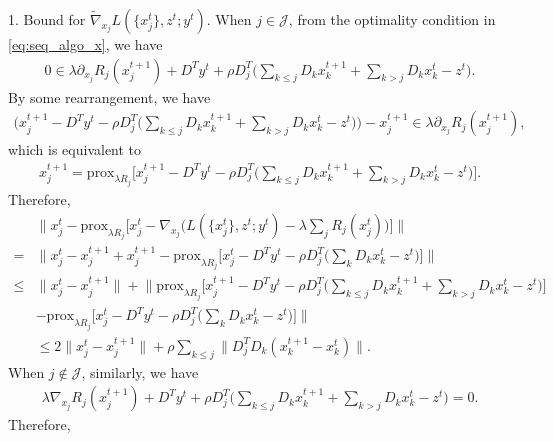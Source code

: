 1. Bound for $\tilde{\nabla}_{x_j} L(\{x^t_j\}, z^t; y^t)$. When $j\in\mathcal{J}$, from the optimality condition in \eqref{eq:seq_algo_x}, we have 
\begin{align}
    0 \in \lambda\partial_{x_j}R_j(x_j^{t+1}) + D^Ty^t + \rho D_j^T\big(\sum_{k\le j} D_kx_k^{t+1} + \sum_{k>j} D_kx_k^{t} - z^{t}\big).\nonumber
\end{align}
By some rearrangement, we have
\begin{align}
    \big(x_j^{t+1} - D^Ty^t - \rho D_j^T\big(\sum_{k\le j} D_kx_k^{t+1} + \sum_{k>j} D_kx_k^{t} - z^{t}\big)\big) - x_j^{t+1} \in \lambda\partial_{x_j}R_j(x_j^{t+1}),\nonumber
\end{align}
which is equivalent to 
\begin{align}
    x_j^{t+1} = \text{prox}_{\lambda R_j}\big[x_j^{t+1} - D^Ty^t - \rho D_j^T\big(\sum_{k\le j} D_kx_k^{t+1} + \sum_{k>j} D_kx_k^{t} - z^{t}\big)\big]. 
\end{align}
Therefore,
\begin{align}
    & \|x_j^t - \text{prox}_{\lambda R_j} \big[x_j^t-\nabla_{x_j}\big(L(\{x^t_j\}, z^t; y^t) - \lambda\sum_j R_j(x_j^t)\big)\big]\|\nonumber\\
    = & \big\|x_j^t - x_j^{t+1} + x_j^{t+1} - \text{prox}_{\lambda R_j}\big[x_j^{t} - D^Ty^t - \rho D_j^T\big(\sum_{k} D_kx_k^{t} - z^{t}\big)\big]\big\|\nonumber\\
    \le & \|x_j^t - x_j^{t+1}\| + \big\|  \text{prox}_{\lambda R_j}\big[x_j^{t+1} - D^Ty^t - \rho D_j^T\big(\sum_{k\le j} D_kx_k^{t+1} + \sum_{k>j} D_kx_k^{t} - z^{t}\big)\big]\nonumber\\
    &  - \text{prox}_{\lambda R_j}\big[x_j^{t} - D^Ty^t - \rho D_j^T\big(\sum_{k} D_kx_k^{t} - z^{t}\big)\big]\big\|\nonumber\\
    & \le 2\|x_j^t - x_j^{t+1}\| + \rho\sum_{k\le j}\|D_j^TD_k(x_k^{t+1} - x_k^t)\|. \label{eq:proof_seq_bound_V_1}
\end{align}
When $j\not\in\mathcal{J}$, similarly, we have
\begin{align}
    \lambda\nabla_{x_j}R_j(x_j^{t+1}) + D^Ty^t + \rho D_j^T\big(\sum_{k\le j} D_kx_k^{t+1} + \sum_{k>j} D_kx_k^{t} - z^{t}\big) = 0.
\end{align}
Therefore,
